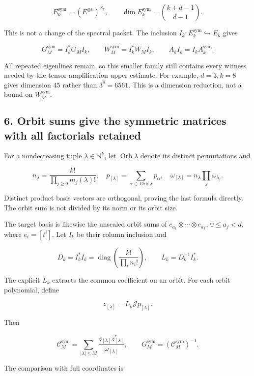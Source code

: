 \documentclass[
]{article}
\begin{document}
\[E_k^{\mathrm{sym}}=(E^{\otimes k})^{S_k},\qquad
\boxed{\dim E_k^{\mathrm{sym}}=\binom{k+d-1}{d-1}.}\tag{5.6}\]

This is not a change of the spectral packet. The inclusion
\(I_k:E_k^{\mathrm{sym}}\hookrightarrow E_k\) gives

\[G_M^{\mathrm{sym}}=I_k^*G_MI_k,\qquad
W_M^{\mathrm{sym}}=I_k^*W_MI_k,\qquad A_kI_k=I_kA_k^{\mathrm{sym}}.\tag{5.7}\]

All repeated eigenlines remain, so this smaller family still contains
every witness needed by the tensor-amplification upper estimate. For
example, \(d=3,k=8\) gives dimension \(45\) rather than \(3^8=6561\).
This is a dimension reduction, not a bound on \(W_M^{\mathrm{sym}}\).

\subsection{6. Orbit sums give the symmetric matrices with all
factorials
retained}\label{orbit-sums-give-the-symmetric-matrices-with-all-factorials-retained}

For a nondecreasing tuple \(\lambda\in\mathbb N^k\), let
\(\operatorname{Orb}\lambda\) denote its distinct permutations and

\[n_\lambda=\frac{k!}{\prod_{j\ge0}m_j(\lambda)!},\quad
p_{[\lambda]}=\sum_{\alpha\in\operatorname{Orb}\lambda}p_\alpha,\quad
\omega_{[\lambda]}=n_\lambda\prod_j\omega_{\lambda_j}.\tag{6.1}\]

Distinct product basis vectors are orthogonal, proving the last formula
directly. The orbit sum is not divided by its norm or its orbit size.

The target basis is likewise the unscaled orbit sums of
\(e_{a_1}\otimes\cdots\otimes e_{a_k}\), \(0\le a_j<d\), where
\(e_i=[t^i]\). Let \(I_k\) be their column inclusion and

\[D_k=I_k^*I_k=\operatorname{diag}\left(\frac{k!}{\prod_i n_i!}\right),\qquad
L_k=D_k^{-1}I_k^*.\tag{6.2}\]

The explicit \(L_k\) extracts the common coefficient on an orbit. For
each orbit polynomial, define

\[z_{[\lambda]}=L_k\mathcal Jp_{[\lambda]}.\]

Then

\[\boxed{\mathcal C_M^{\mathrm{sym}}
=\sum_{|\lambda|\le M}\frac{z_{[\lambda]}z_{[\lambda]}^*}{\omega_{[\lambda]}},\qquad
G_M^{\mathrm{sym}}=(\mathcal C_M^{\mathrm{sym}})^{-1}.}\tag{6.3}\]

The comparison with full coordinates is
\end{document}
